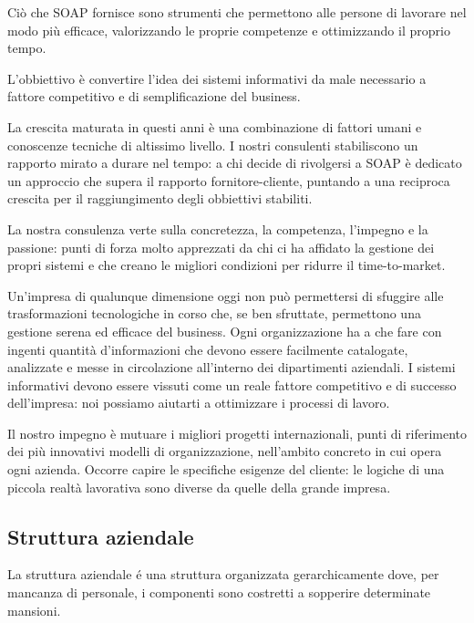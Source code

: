 \documentclass[../../documentazione.tex]{subfiles}
\begin{document}
    Ciò che SOAP fornisce sono strumenti che permettono alle persone di lavorare nel modo più efficace,
    valorizzando le proprie competenze e ottimizzando il proprio tempo.

    L'obbiettivo è convertire l'idea dei sistemi informativi da male necessario a fattore competitivo e di semplificazione del business.

    La crescita maturata in questi anni è una combinazione di fattori umani e conoscenze tecniche di altissimo livello.
    I nostri consulenti stabiliscono un rapporto mirato a durare nel tempo: a chi decide di rivolgersi a SOAP è dedicato
    un approccio che supera il rapporto fornitore-cliente, puntando a una reciproca crescita per il raggiungimento degli obbiettivi stabiliti.

    La nostra consulenza verte sulla concretezza, la competenza, l'impegno e la passione:
    punti di forza molto apprezzati da chi ci ha affidato la gestione dei propri sistemi e che creano le migliori condizioni
    per ridurre il time-to-market.

    Un'impresa di qualunque dimensione oggi non può permettersi di sfuggire alle trasformazioni tecnologiche in corso che,
    se ben sfruttate, permettono una gestione serena ed efficace del business.
    Ogni organizzazione ha a che fare con ingenti quantità d'informazioni che devono essere facilmente catalogate,
    analizzate e messe in circolazione all'interno dei dipartimenti aziendali.
    I sistemi informativi devono essere vissuti come un reale fattore competitivo e di successo dell'impresa:
    noi possiamo aiutarti a ottimizzare i processi di lavoro.

    Il nostro impegno è mutuare i migliori progetti internazionali, punti di riferimento dei più innovativi modelli di organizzazione,
    nell'ambito concreto in cui opera ogni azienda. Occorre capire le specifiche esigenze del cliente:
    le logiche di una piccola realtà lavorativa sono diverse da quelle della grande impresa.

    \subsection{Struttura aziendale}\label{subsec:struttura-aziendale}
    La struttura aziendale é una struttura organizzata gerarchicamente dove, per mancanza di personale, i componenti sono
    costretti a sopperire determinate mansioni.
\end{document}
